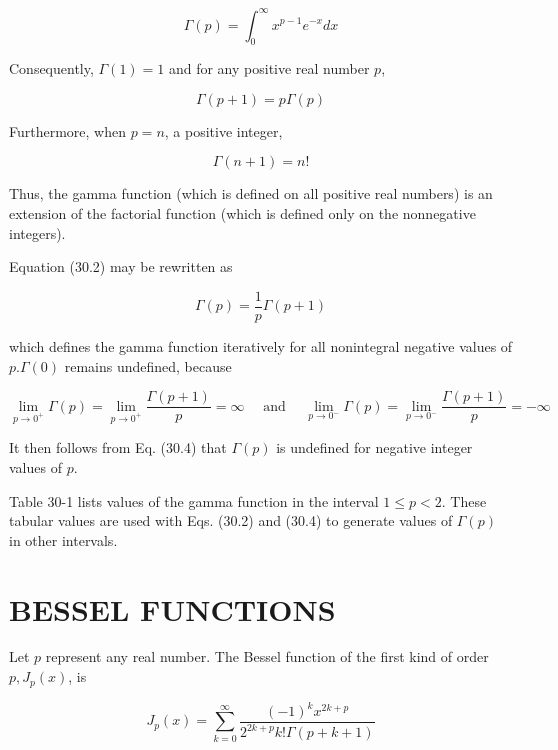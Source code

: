 \documentclass[10pt]{article}
\begin{document}
\begin{equation*}
\Gamma(p)=\int_{0}^{\infty} x^{p-1} e^{-x} d x \tag{30.1}
\end{equation*}


Consequently, $\Gamma(1)=1$ and for any positive real number $p$,


\begin{equation*}
\Gamma(p+1)=p \Gamma(p) \tag{30.2}
\end{equation*}


Furthermore, when $p=n$, a positive integer,


\begin{equation*}
\Gamma(n+1)=n ! \tag{30.3}
\end{equation*}


Thus, the gamma function (which is defined on all positive real numbers) is an extension of the factorial function (which is defined only on the nonnegative integers).

Equation (30.2) may be rewritten as


\begin{equation*}
\Gamma(p)=\frac{1}{p} \Gamma(p+1) \tag{30.4}
\end{equation*}


which defines the gamma function iteratively for all nonintegral negative values of $p . \Gamma(0)$ remains undefined, because

$$
\lim _{p \rightarrow 0^{+}} \Gamma(p)=\lim _{p \rightarrow 0^{+}} \frac{\Gamma(p+1)}{p}=\infty \quad \text { and } \quad \lim _{p \rightarrow 0^{-}} \Gamma(p)=\lim _{p \rightarrow 0^{-}} \frac{\Gamma(p+1)}{p}=-\infty
$$

It then follows from Eq. (30.4) that $\Gamma(p)$ is undefined for negative integer values of $p$.

Table 30-1 lists values of the gamma function in the interval $1 \leq p<2$. These tabular values are used with Eqs. (30.2) and (30.4) to generate values of $\Gamma(p)$ in other intervals.

\section*{BESSEL FUNCTIONS}
Let $p$ represent any real number. The Bessel function of the first kind of order $p, J_{p}(x)$, is


\begin{equation*}
J_{p}(x)=\sum_{k=0}^{\infty} \frac{(-1)^{k} x^{2 k+p}}{2^{2 k+p} k ! \Gamma(p+k+1)} \tag{30.5}
\end{equation*}
\end{document}
